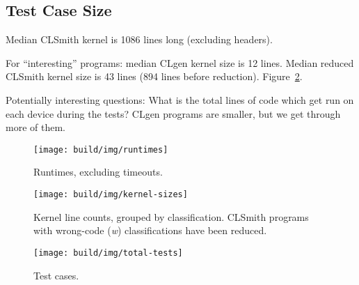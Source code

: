 

\subsection{Test Case Size}

Median CLSmith kernel is 1086 lines long (excluding headers).

For ``interesting'' programs: median CLgen kernel size is 12 lines. Median reduced CLSmith kernel size is 43 lines (894 lines before reduction). Figure~\ref{fig:kernel-sizes}.

Potentially interesting questions: What is the total lines of code which get run on each device during the tests? CLgen programs are smaller, but we get through more of them.



\begin{figure}
	\centering %
	\texttt{[image: build/img/runtimes]}%
	\caption{%
		Runtimes, excluding timeouts. %
	}%
	\label{fig:runtimes} %
\end{figure}


\begin{figure}
	\centering %
	\texttt{[image: build/img/kernel-sizes]}%
	\caption{%
		Kernel line counts, grouped by classification. CLSmith programs with wrong-code (\emph{w}) classifications have been reduced.%
	}%
	\label{fig:kernel-sizes} %
\end{figure}


\begin{figure}
	\centering %
	\texttt{[image: build/img/total-tests]}%
	\caption{%
		Test cases.%
	}%
	\label{fig:total-tests} %
\end{figure}
